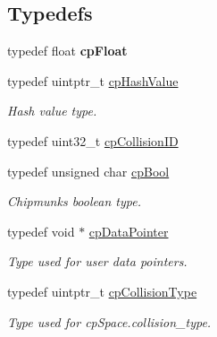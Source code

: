 \subsection*{Typedefs}
\begin{DoxyCompactItemize}
\item 
\mbox{\label{group__basicTypes_gadd61042e5d8fad8697df27a086533d19}} 
typedef float {\bfseries cp\+Float}
\item 
\mbox{\label{group__basicTypes_gae7eb4775a9f43914a15553ca65a048f4}} 
typedef uintptr\+\_\+t \hyperlink{group__basicTypes_gae7eb4775a9f43914a15553ca65a048f4}{cp\+Hash\+Value}
\begin{DoxyCompactList}\small\item\em Hash value type. \end{DoxyCompactList}\item 
typedef uint32\+\_\+t \hyperlink{group__basicTypes_ga89d4043ca0567e947aaca19cf9600df5}{cp\+Collision\+ID}
\item 
\mbox{\label{group__basicTypes_gabc5e752c48f3449ca26ef413ecbd647e}} 
typedef unsigned char \hyperlink{group__basicTypes_gabc5e752c48f3449ca26ef413ecbd647e}{cp\+Bool}
\begin{DoxyCompactList}\small\item\em Chipmunk\textquotesingle{}s boolean type. \end{DoxyCompactList}\item 
\mbox{\label{group__basicTypes_ga2ac2c3c31e21893941f9e4f8ee279447}} 
typedef void $\ast$ \hyperlink{group__basicTypes_ga2ac2c3c31e21893941f9e4f8ee279447}{cp\+Data\+Pointer}
\begin{DoxyCompactList}\small\item\em Type used for user data pointers. \end{DoxyCompactList}\item 
\mbox{\label{group__basicTypes_gae83e2f50965eb441e36ffff1e32e6d02}} 
typedef uintptr\+\_\+t \hyperlink{group__basicTypes_gae83e2f50965eb441e36ffff1e32e6d02}{cp\+Collision\+Type}
\begin{DoxyCompactList}\small\item\em Type used for cp\+Space.\+collision\+\_\+type. \end{DoxyCompactList}\item 

\end{DoxyCompactItemize}
